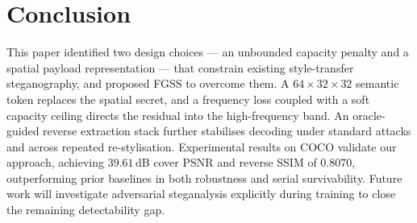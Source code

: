 \documentclass[conference]{IEEEtran}
\begin{document}
\section{Conclusion}
This paper identified two design choices --- an unbounded capacity penalty and a spatial payload representation --- that constrain existing style-transfer steganography, and proposed FGSS to overcome them. A $64\!\times\!32\!\times\!32$ semantic token replaces the spatial secret, and a frequency loss coupled with a soft capacity ceiling directs the residual into the high-frequency band. An oracle-guided reverse extraction stack further stabilises decoding under standard attacks and across repeated re-stylisation. Experimental results on COCO validate our approach, achieving $39.61$\,dB cover PSNR and reverse SSIM of $0.8070$, outperforming prior baselines in both robustness and serial survivability. Future work will investigate adversarial steganalysis explicitly during training to close the remaining detectability gap.
\end{document}
